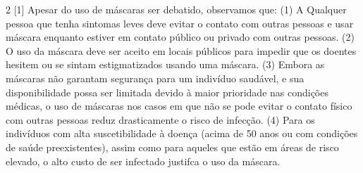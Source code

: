 \documentclass[onecolumn,journal]{IEEEtran}
\begin{document}
\begin{multicols}{2}
[1] Apesar do uso de máscaras ser debatido, observamos que: (1) A Qualquer pessoa que tenha sintomas leves deve evitar o contato com outras pessoas e usar máscara enquanto estiver em contato público ou privado com outras pessoas. (2) O uso da máscara deve ser aceito em locais públicos para impedir que os doentes hesitem ou se sintam estigmatizados usando uma máscara. (3) Embora as máscaras não garantam segurança para um indivíduo saudável, e sua disponibilidade possa ser limitada devido à maior prioridade nas condições médicas, o uso de máscaras nos casos em que não se pode evitar o contato físico com outras pessoas reduz drasticamente o risco de infecção. (4) Para os indivíduos com alta suscetibilidade à doença (acima de 50 anos ou com condições de saúde preexistentes), assim como para aqueles que estão em áreas de risco elevado, o alto custo de ser infectado justifca o uso da máscara.


\end{multicols}

\vspace{2ex}







% 

\end{document}
